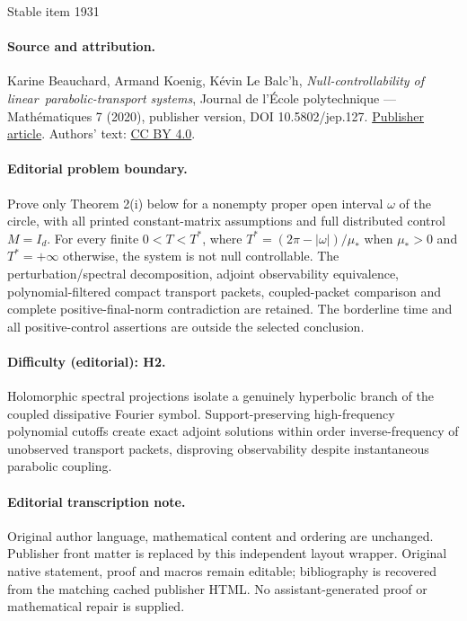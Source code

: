 \documentclass[11pt]{article}
\theoremstyle{plain}
\theoremstyle{definition}
\theoremstyle{remark}
\begin{document}
\begin{center}{\Large Stable item 1931}\end{center}
\paragraph{Source and attribution.}
Karine Beauchard, Armand Koenig, Kévin Le Balc’h, \emph{Null-controllability of linear parabolic-transport systems}, Journal de l’École polytechnique — Mathématiques 7 (2020), publisher version, DOI 10.5802/jep.127. \href{https://jep.centre-mersenne.org/articles/10.5802/jep.127/}{Publisher article}. Authors' text: \href{https://creativecommons.org/licenses/by/4.0/}{CC BY 4.0}.
\paragraph{Editorial problem boundary.}
Prove only Theorem 2(i) below for a nonempty proper open interval \(\omega\) of the circle, with all printed constant-matrix assumptions and full distributed control \(M=I_d\). For every finite \(0<T<T^*\), where \(T^*=(2\pi-|\omega|)/\mu_*\) when \(\mu_*>0\) and \(T^*=+\infty\) otherwise, the system is not null controllable. The perturbation/spectral decomposition, adjoint observability equivalence, polynomial-filtered compact transport packets, coupled-packet comparison and complete positive-final-norm contradiction are retained. The borderline time and all positive-control assertions are outside the selected conclusion.
\paragraph{Difficulty (editorial): H2.}
Holomorphic spectral projections isolate a genuinely hyperbolic branch of the coupled dissipative Fourier symbol. Support-preserving high-frequency polynomial cutoffs create exact adjoint solutions within order inverse-frequency of unobserved transport packets, disproving observability despite instantaneous parabolic coupling.
\paragraph{Editorial transcription note.}
Original author language, mathematical content and ordering are unchanged. Publisher front matter is replaced by this independent layout wrapper. Original native statement, proof and macros remain editable; bibliography is recovered from the matching cached publisher HTML. No assistant-generated proof or mathematical repair is supplied.
\clearpage
\end{document}
